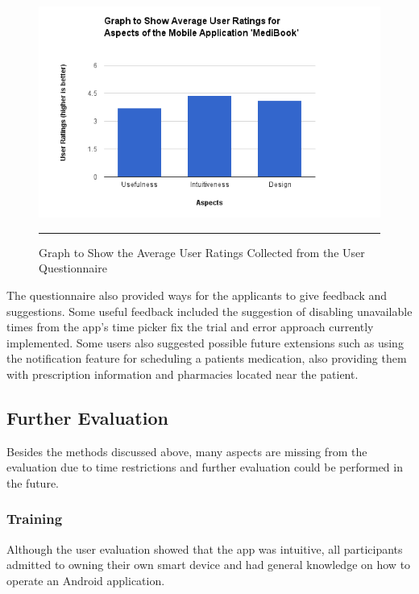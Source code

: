 \begin{figure}[htbp]
	\centering
		\includegraphics[width=\textwidth,height=\textheight,keepaspectratio]{Figures/AverageRatings.png}
		\rule{35em}{0.5pt}
		\caption[Graph to Show the Average User Ratings Collected from the User Questionnaire]{Graph to Show the Average User Ratings Collected from the User Questionnaire}
	\label{fig:questionnaireresults}
\end{figure}

The questionnaire also provided ways for the applicants to give feedback and suggestions. Some useful feedback included the suggestion of disabling unavailable times from the app's time picker fix the trial and error approach currently implemented. Some users also suggested possible future extensions such as using the notification feature for scheduling a patients medication, also providing them with prescription information and pharmacies located near the patient.

\subsection{Further Evaluation}

Besides the methods discussed above, many aspects are missing from the evaluation due to time restrictions and further evaluation could be performed in the future.

\subsubsection{Training}

Although the user evaluation showed that the app was intuitive, all participants admitted to owning their own smart device and had general knowledge on how to operate an Android application.

